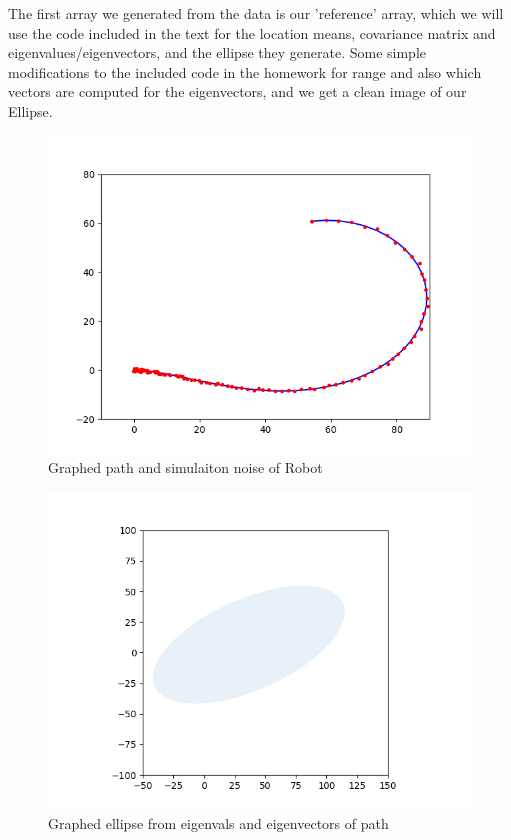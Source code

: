 \documentclass[letterpaper,11pt]{texMemo} %
\begin{document}
The first array we generated from the data is our 'reference' array, which we will use the code 
included in the text for the location means, covariance matrix and eigenvalues/eigenvectors, and the 
ellipse they generate. Some simple modifications to the included code in the homework for range and 
also which vectors are computed for the eigenvectors, and we get a clean image of our Ellipse.

\begin{figure}[ht]
    \caption{Graphed path and simulaiton noise of Robot}
    \centering
    \includegraphics[scale=0.45]{img/P5a.png}
\end{figure}

\begin{figure}[ht]
    \caption{Graphed ellipse from eigenvals and eigenvectors of path}
    \centering
    \includegraphics[scale=0.45]{img/P5b.png}
\end{figure}
\end{document}
